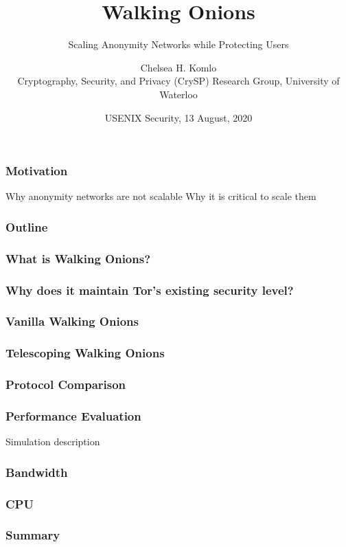 \documentclass{beamer}
\title{Walking Onions}
\subtitle{Scaling Anonymity Networks while Protecting Users}
\author[Chelsea Komlo]{Chelsea H. Komlo\\{\footnotesize
Cryptography, Security, and Privacy (CrySP) Research
Group, University of Waterloo}}
\institute{\small Joint work with Nick Mathewson, Ian Goldberg}
\date{\small USENIX Security, 13 August, 2020}
\begin{document}
\begin{frame}
        \thispagestyle{empty}
        \maketitle
\end{frame}


\begin{frame}
\frametitle{Motivation}
Why anonymity networks are not scalable
Why it is critical to scale them
\end{frame}

\begin{frame}
\frametitle{Outline}
\end{frame}

\begin{frame}
\frametitle{What is Walking Onions?}
\end{frame}

\begin{frame}
\frametitle{Why does it maintain Tor's existing security level?}
\end{frame}

\begin{frame}
\frametitle{Vanilla Walking Onions}
\end{frame}

\begin{frame}
\frametitle{Telescoping Walking Onions}
\end{frame}

\begin{frame}
\frametitle{Protocol Comparison}
\end{frame}

\begin{frame}
\frametitle{Performance Evaluation}
Simulation description
\end{frame}

\begin{frame}
\frametitle{Bandwidth}
\end{frame}

\begin{frame}
\frametitle{CPU}
\end{frame}

\begin{frame}
\frametitle{Summary}
\end{frame}
\end{document}
